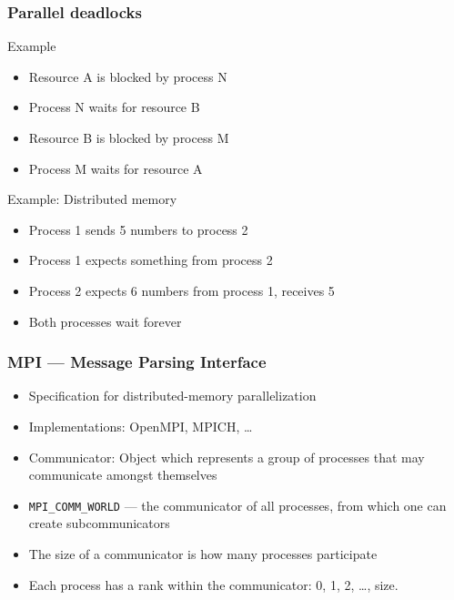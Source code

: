 \documentclass[usenames,dvipsnames,mathserif,compress]{beamer}
\begin{document}
\begin{frame}
  \frametitle{Parallel deadlocks}
  \begin{block}{Example}
  \begin{itemize}
  \item Resource A is blocked by process N
  \item Process N waits for resource B
  \item Resource B is blocked by process M
  \item Process M waits for resource A
  \end{itemize}
  \end{block}

  \begin{block}{Example: Distributed memory}
    \begin{itemize}
    \item Process 1 sends 5 numbers to process 2
    \item Process 1 expects something from process 2
    \item Process 2 expects 6 numbers from process 1, receives 5
    \item Both processes wait forever
    \end{itemize}
  \end{block}
\end{frame}

\begin{frame}[fragile]
  \frametitle{MPI --- Message Parsing Interface}
  \begin{itemize}
  \item Specification for distributed-memory parallelization
  \item Implementations: OpenMPI, MPICH, \ldots
  \item \alert{Communicator}: Object which represents a group of processes that may communicate amongst themselves
  \item \verb#MPI_COMM_WORLD# --- the communicator of all processes, from which one can create subcommunicators
  \item The \alert{size} of a communicator is how many processes participate
  \item Each process has a \alert{rank} within the communicator: 0, 1, 2, \ldots, size.
  \end{itemize}
\end{frame}
\end{document}
